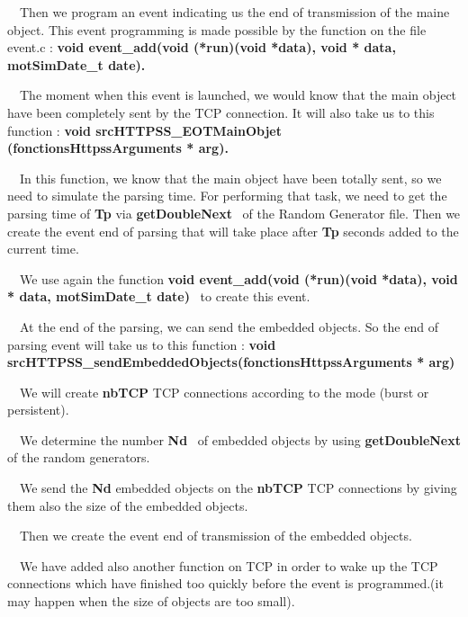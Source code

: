 \documentclass[a4paper]{article}
\begin{document}
\bigskip

{
\ \ Then we program an event indicating us the end of transmission of
the maine object. This event programming is made possible by the
function on the file event.c : \textbf{void event\_add(void (*run)(void
*data), void * data, motSimDate\_t date).}}


\bigskip

{
\ \ The moment when this event is launched, we would know that the main
object have been completely sent by the TCP connection. It will also
take us to this function : \textbf{void srcHTTPSS\_EOTMainObjet
(fonctionsHttpssArguments * arg).}}


\bigskip

{
\ \ In this function, we know that the main object have been totally
sent, so we need to simulate the parsing time. For performing that
task, we need to get the parsing time of \textbf{Tp }via
\textbf{getDoubleNext }\ of the Random Generator file. Then we create
the event end of parsing that will take place after \textbf{Tp }seconds
added to the current time.}

{
\ \ We use again the function \textbf{void event\_add(void (*run)(void
*data), void * data, motSimDate\_t date) }\ to create this event.}


\bigskip

{
\ \ At the end of the parsing, we can send the embedded objects. So the
end of parsing event will take us to this function : \textbf{void
srcHTTPSS\_sendEmbeddedObjects(fonctionsHttpssArguments * arg)}}

{
\ \ We will create \textbf{nbTCP }TCP connections according to the mode
(burst or persistent).}

{
\ \ We determine the number \textbf{Nd }\ of embedded objects by using
\textbf{getDoubleNext }of the random generators.}

{
\ \ We send the \textbf{Nd }embedded objects on the \textbf{nbTCP} TCP
connections by giving them also the size of the embedded objects.}

{
\ \ Then we create the event end of transmission of the embedded
objects.}

{
\ \ We have added also another function on TCP in order to wake up the
TCP connections which have finished too quickly before the event is
programmed.(it may happen when the size of objects are too small).}
\end{document}
